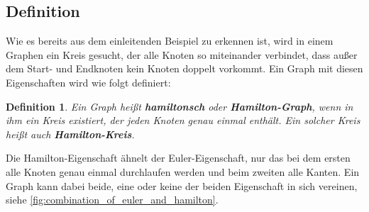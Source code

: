 \documentclass{article}
\newtheorem{mydef}{Definition}
\begin{document}
%
%
%



%
%
%
\subsection{Definition}

Wie es bereits aus dem einleitenden Beispiel zu erkennen ist, wird in einem Graphen ein Kreis gesucht, der alle Knoten so miteinander verbindet, dass außer dem Start- und Endknoten kein Knoten doppelt vorkommt. Ein Graph mit diesen Eigenschaften wird wie folgt definiert:

\begin{mydef}\label{thm:definition_hamilton_graph}
	Ein Graph heißt \textbf{hamiltonsch} oder \textbf{Hamilton-Graph}, wenn in ihm ein Kreis existiert, der jeden Knoten genau einmal enthält. Ein solcher Kreis heißt auch \textbf{Hamilton-Kreis}.\cite{busing2010graphen}
\end{mydef}

Die Hamilton-Eigenschaft ähnelt der Euler-Eigenschaft, nur das bei dem ersten alle Knoten genau einmal durchlaufen werden und beim zweiten alle Kanten. Ein Graph kann dabei beide, eine oder keine der beiden Eigenschaft in sich vereinen, siehe \autoref{fig:combination_of_euler_and_hamilton}.
\end{document}
